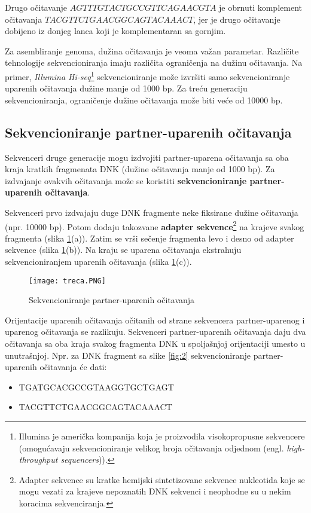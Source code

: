 \documentclass[12pt,oneside]{memoir}
\begin{document}
\noindent Drugo očitavanje $AGTTTGTACTGCCGTTCAGAACGTA$ je obrnuti komplement očitavanja $TACGTTCTGAACGGCAGTACAAACT$, jer je drugo očitavanje dobijeno iz donjeg lanca koji je komplementaran sa gornjim.

Za asembliranje genoma, dužina očitavanja je veoma važan parametar. Različite tehnologije sekvencioniranja imaju različita ograničenja na dužinu očitavanja. Na primer, \textit{Illumina Hi-seq}\footnote{Illumina je američka kompanija koja je proizvodila visokopropusne sekvencere (omogućavaju sekvencioniranje velikog broja očitavanja odjednom  (engl. \textit{high-throughput sequencers})).} sekvencioniranje može izvršiti samo sekvencioniranje uparenih očitavanja dužine manje od 1000 bp. Za treću generaciju sekvencioniranja, ograničenje dužine očitavanja može biti veće od 10000 bp.


\subsection{Sekvencioniranje partner-uparenih očitavanja}

Sekvenceri druge generacije mogu izdvojiti partner-uparena očitavanja sa oba kraja kratkih fragmenata DNK (dužine očitavanja manje od 1000 bp). Za izdvajanje ovakvih očitavanja može se koristiti \textbf{sekvencioniranje partner-uparenih očitavanja}.

Sekvenceri prvo izdvajaju duge DNK fragmente neke fiksirane dužine očitavanja (npr. 10000 bp). Potom dodaju takozvane \textbf{adapter sekvence}\footnote{Adapter sekvence su kratke hemijski sintetizovane sekvence
nukleotida koje se mogu vezati za krajeve nepoznatih DNK sekvenci i neophodne
su u nekim koracima sekvenciranja.}
na krajeve svakog fragmenta (slika \ref{fig:3}(a)). Zatim se vrši sečenje fragmenta levo i desno od adapter sekvence (slika \ref{fig:3}(b)). Na kraju se uparena očitavanja ekstrahuju sekvencioniranjem uparenih očitavanja (slika \ref{fig:3}(c)).

\begin{figure}[!ht]
  \centering
  \texttt{[image: treca.PNG]}
  \caption{Sekvencioniranje partner-uparenih očitavanja \cite{WingKinSung}}
\label{fig:3}
\end{figure}

Orijentacije uparenih očitavanja očitanih od strane sekvencera partner-uparenog i uparenog očitavanja se razlikuju. Sekvenceri partner-uparenih očitavanja daju dva očitavanja sa oba kraja svakog fragmenta DNK u spoljašnjoj orijentaciji umesto u unutrašnjoj. Npr. za DNK fragment sa slike \ref{fig:2} sekvencioniranje partner-uparenih očitavanja će dati:
\begin{itemize}
\itemsep0em 
    \item {TGATGCACGCCGTAAGGTGCTGAGT}
    \item {TACGTTCTGAACGGCAGTACAAACT}
\end{itemize}
\end{document}
